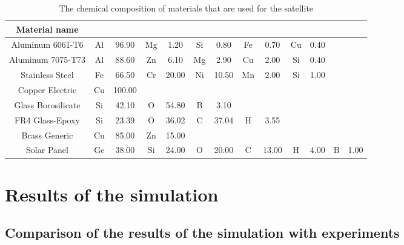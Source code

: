 \documentclass[12pt, a4paper,titlepage]{article}
\numberwithin{equation}{section}
\numberwithin{figure}{section}
\begin{document}
\begin{table}

\begin{center}
\begin{tabular}{ |c|c|c|c|c|c|c|c|c|c|c|c|c|} 
 \hline
Material name & &&&&&&&&&&& \\\hline

Aluminum 6061-T6 &	Al & 96.90 &	Mg &	1.20 &	Si &	0.80 &	Fe &	0.70 &	Cu &	0.40 & &\\\hline		
Aluminum 7075-T73 &	Al &	88.60 &	Zn &	6.10 &	Mg &	2.90 &	Cu &	2.00 &	Si &	0.40 & &\\\hline		
Stainless Steel &	Fe &	66.50 &	Cr &	20.00 &	Ni &	10.50	&Mn &	2.00 &	Si &	1.00 & &\\\hline		
Copper Electric  &Cu &	100.00 & & & & & & & & & &	\\\hline					
Glass Borosilicate &	Si &	42.10 &	O &	54.80 &	B &	3.10 & & & & & &\\\hline			
FR4 Glass-Epoxy &	Si &	23.39 &	O &	36.02 &	C &	37.04 &	H &	3.55 & & & &\\\hline		
Brass Generic &	Cu &	85.00 &	Zn &	15.00 & & & & & & & &\\\hline						
Solar Panel &	Ge &	38.00 &	Si &	24.00 &	O &	20.00 &	C &	13.00 &	H &	4.00 &	B &	1.00\\\hline
\end{tabular}
\end{center}
\caption{The chemical composition of materials that are used for the satellite}
\end{table}

\pagebreak

\section{Results of the simulation}
\subsection{Comparison of the results of the simulation with experiments}

\end{document}
